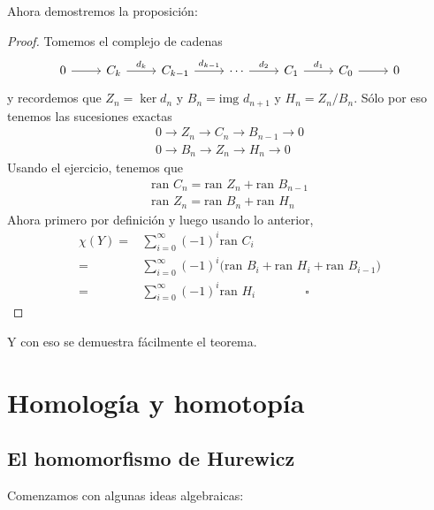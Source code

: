 \documentclass[spanish]{book}
\theoremstyle{definition}
\begin{document}
	Ahora demostremos la proposición:
	\begin{proof}
		Tomemos el complejo de cadenas
		\[\begin{tikzcd}
			0 \arrow[r] & C_k \arrow[r, "d_k"] & C_{k-1} \arrow[r, "d_{k-1}"] & \cdots \arrow[r, "d_2"] & C_1 \arrow[r, "d_1"] & C_0 \arrow[r] & 0
		\end{tikzcd}\]
		y recordemos que $Z_n=\ker d_n$ y $B_n=\text{img }d_{n+1}$ y $H_n=Z_n/B_n$. Sólo por eso tenemos las sucesiones exactas
		\begin{align*}
			0\to Z_n\to C_n\to B_{n-1}\to 0\\
			0\to B_n\to Z_n\to H_n\to 0
		\end{align*}
		Usando el ejercicio, tenemos que
		\begin{align*}
			\text{ran }C_n=\text{ran }Z_n+\text{ran }B_{n-1}\\
			\text{ran }Z_n=\text{ran }B_n+\text{ran }H_{n}
		\end{align*}
		Ahora primero por definición y luego usando lo anterior,
		\begin{align*}\chi(Y)=&\sum_{i=0}^\infty(-1)^i\text{ran }C_i\\
			=&\sum_{i=0}^\infty(-1)^i\Big(\text{ran }B_i+\text{ran }H_i+\text{ran }B_{i-1}\Big)\\
			=&\sum_{i=0}^\infty(-1)^i\text{ran }H_i\qquad\qquad\square
		\end{align*}
	\end{proof}
	Y con eso se demuestra fácilmente el teorema.

\chapter{Homología y homotopía}	
\section{El homomorfismo de Hurewicz}
Comenzamos con algunas ideas algebraicas:
\end{document}
